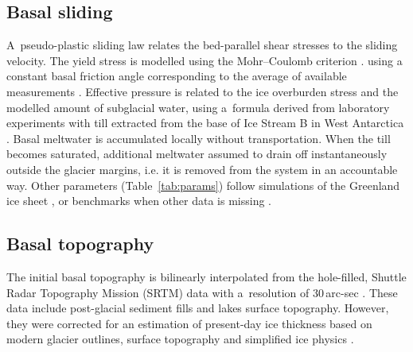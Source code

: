 \documentclass[tc, manuscript]{copernicus}
\begin{document}
\subsection{Basal sliding}
\label{sec:sliding}

    A~pseudo-plastic sliding law relates the bed-parallel shear stresses to the
    sliding velocity. The yield stress is modelled using the Mohr--Coulomb
    criterion \citep[Table~\ref{tab:params};][Eq.~18]{Tulaczyk.etal.2000}.
    using a constant basal friction angle corresponding to the average of
    available measurements \citep[p.~268]{Cuffey.Paterson.2010}.
    Effective pressure is related to the ice overburden stress and the modelled
    amount of subglacial water, using a~formula derived from laboratory
    experiments with till extracted from the base of Ice Stream B in West
    Antarctica \citep[Table~\ref{tab:params};][Eqs~23 and
    24]{Tulaczyk.etal.2000, Bueler.Pelt.2015}. Basal meltwater is accumulated
    locally without transportation. When the till becomes saturated, additional
    meltwater assumed to drain off instantaneously outside the glacier margins,
    i.e. it is removed from the system in an accountable way. Other parameters
    (Table~\ref{tab:params}) follow simulations of the Greenland ice sheet
    \citep{Aschwanden.etal.2013}, or benchmarks when other data is missing
    \citep{Bueler.Pelt.2015}.


\subsection{Basal topography}
\label{sec:bedrock}

    The initial basal topography is bilinearly interpolated from the
    hole-filled, Shuttle Radar Topography Mission (SRTM) data with a~resolution
    of 30\,arc-sec \citep[Fig.~\ref{fig:inputs}b;][]{Jarvis.etal.2008}. These
    data include post-glacial
    sediment fills and lakes surface topography. However, they were corrected
    for an estimation of present-day ice thickness based on modern
    glacier outlines, surface topography and simplified ice physics
    \citep[Fig.~\ref{fig:inputs}c;][]{Huss.Farinotti.2012}.
\end{document}
